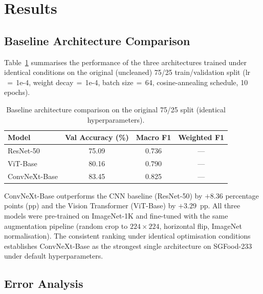 
\section{Results}\label{sec:results}

\subsection{Baseline Architecture Comparison}\label{sec:baseline}

Table~\ref{tab:baseline} summarises the performance of the three architectures
trained under identical conditions on the original (uncleaned) 75/25
train/validation split (lr$\,{=}\,$1e-4, weight decay$\,{=}\,$1e-4,
batch size$\,{=}\,$64, cosine-annealing schedule, 10 epochs).

\begin{table}[ht]
\centering
\caption{Baseline architecture comparison on the original 75/25 split
         (identical hyperparameters).}
\label{tab:baseline}
\begin{tabular}{lccc}
\toprule
\textbf{Model} & \textbf{Val Accuracy (\%)} & \textbf{Macro F1} & \textbf{Weighted F1} \\
\midrule
ResNet-50   & 75.09 & 0.736 & --- \\
ViT-Base    & 80.16 & 0.790 & --- \\
ConvNeXt-Base & 83.45 & 0.825 & --- \\
\bottomrule
\end{tabular}
\end{table}

ConvNeXt-Base outperforms the CNN baseline (ResNet-50) by
$+8.36$ percentage points (pp) and the Vision Transformer (ViT-Base) by
$+3.29$~pp.  All three models were pre-trained on ImageNet-1K and
fine-tuned with the same augmentation pipeline (random crop to
$224{\times}224$, horizontal flip, ImageNet normalisation).  The
consistent ranking under identical optimisation conditions establishes
ConvNeXt-Base as the strongest single architecture on SGFood-233 under
default hyperparameters.

\subsection{Error Analysis}\label{sec:error-analysis}

